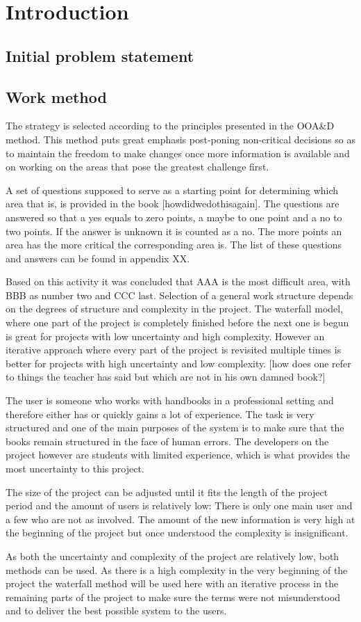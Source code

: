 \chapter{Introduction}
\section{Initial problem statement}
\section{Work method}
The strategy is selected according to the principles presented in the OOA\&D method. This method puts great emphasis post-poning non-critical decisions so as to maintain the freedom to make changes once more information is available and on working on the areas that pose the greatest challenge first.

A set of questions supposed to serve as a starting point for determining which area that is, is provided in the book [howdidwedothisagain]. The questions are answered so that a yes equals to zero points, a maybe to one point and a no to two points. If the answer is unknown it is counted as a no. The more points an area has the more critical the corresponding area is. The list of these questions and answers can be found in appendix XX.

Based on this activity it was concluded that AAA is the most difficult area, with BBB as number two and CCC last.
Selection of a general work structure depends on the degrees of structure and complexity in the project. The waterfall model, where one part of the project is completely finished before the next one is begun is great for projects with low uncertainty and high complexity. However an iterative approach where every part of the project is revisited  multiple times is better for projects with high uncertainty and low complexity. [how does one refer to things the teacher has said but which are not in his own damned book?] %

The user is someone who works with handbooks in a professional setting and therefore either has or quickly gains a lot of experience. The task is very structured and one of the main purposes of the system is to make sure that the books remain structured in the face of human errors. The developers on the project however are students with limited experience, which is what provides the most uncertainty to this project.

The size of the project can be adjusted until it fits the length of the project period and the amount of users is relatively low: There is only one main user and a few who are not as involved. The amount of the new information is very high at the beginning of the project but once understood the complexity is insignificant.

As both the uncertainty and complexity of the project are relatively low, both methods can be used. As there is a high complexity in the very beginning of the project the waterfall method will be used here with an iterative process in the remaining parts of the project to make sure the terms were not misunderstood and to deliver the best possible system to the users.

